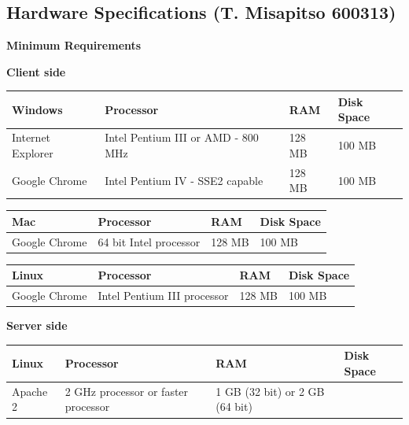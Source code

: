 \documentclass[10pt,onecolumn]{lab}
\begin{document}
\subsection{Hardware Specifications (T. Misapitso 600313)}
\textbf{Minimum Requirements}
\begin{center}
	\textbf{Client side}\\
	\begin{tabular}{ | p{5cm} | p{4cm} | p{3cm} | p{3cm} |}
		\hline
		\textbf{Windows} & \textbf{Processor} & \textbf{RAM} & \textbf{Disk Space}\\ \hline
		Internet Explorer	&	Intel Pentium III	
		or AMD - 800 MHz	&	128 MB	&	100 MB		\\ \hline
		Google Chrome		&	Intel Pentium IV - 
		SSE2 capable		&	128 MB	&	100 MB		\\ \hline
	\end{tabular}
	
	
	\begin{tabular}{ | p{5cm} | p{4cm} | p{3cm} | p{3cm} |}
		\hline
		\textbf{Mac} & \textbf{Processor} & \textbf{RAM} & \textbf{Disk Space}\\			\hline
		Google Chrome		&	64 bit Intel  
		processor	       &   128 MB  &	100 MB	\\ \hline
	\end{tabular}
	
	
	\begin{tabular}{ | p{5cm} | p{4cm} | p{3cm} | p{3cm} |}
		\hline			\textbf{Linux} & \textbf{Processor} & \textbf{RAM} & \textbf{Disk Space}\\
		\hline
		Google Chrome		&	Intel Pentium III  
		processor	       &   128 MB  &	100 MB	\\ \hline
	\end{tabular}
	
	\textbf{Server side}\\
	\begin{tabular}{ | p{5cm} | p{4cm} | p{3cm} | p{3cm} |}
		\hline	
		\textbf{Linux} & \textbf{Processor} & \textbf{RAM} & \textbf{Disk Space}\\
		\hline
		Apache 2		&	2 GHz processor or faster  
		processor	       &   1 GB (32 bit) or 2 GB (64 bit)  &		\\ \hline
	\end{tabular}
\end{center}
\end{document}

